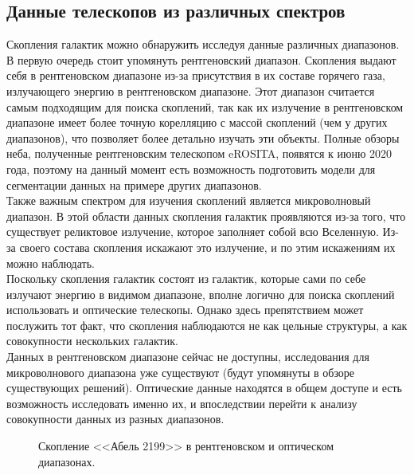 \subsection{Данные телескопов из различных спектров}

Скопления галактик можно обнаружить исследуя данные различных диапазонов.\\

В первую очередь стоит упомянуть рентгеновский диапазон. Скопления выдают себя в рентгеновском 
диапазоне из-за присутствия в их составе горячего газа, излучающего энергию в рентгеновском 
диапазоне. Этот диапазон считается самым подходящим для поиска скоплений, так как их излучение 
в рентгеновском диапазоне имеет более точную корелляцию с массой скоплений (чем у других диапазонов), 
что позволяет более детально изучать эти объекты. Полные обзоры неба, полученные рентгеновским 
телескопом eROSITA, появятся к июню 2020 года, поэтому на данный момент есть возможность 
подготовить модели для сегментации данных на примере других диапазонов.\\

Также важным спектром для изучения скоплений является микроволновый диапазон. В этой области данных 
скопления галактик проявляются из-за того, что существует реликтовое излучение, которое заполняет 
собой всю Вселенную. Из-за своего состава скопления искажают это излучение, и по этим искажениям 
их можно наблюдать.\\ 

Поскольку скопления галактик состоят из галактик, которые сами по себе излучают энергию в видимом 
диапазоне, вполне логично для поиска скоплений использовать и оптические телескопы. Однако здесь 
препятствием может послужить тот факт, что скопления наблюдаются не как цельные структуры, а как 
совокупности нескольких галактик. \\

Данных в рентгеновском диапазоне сейчас не доступны, исследования для микроволнового диапазона уже 
существуют (будут упомянуты в обзоре существующих решений). Оптические данные находятся в общем 
доступе и есть возможность исследовать именно их, и впоследствии перейти к анализу совокупности 
данных из разных диапазонов.\\

\begin{figure}[h]
    \caption{Скопление <<Абель 2199>> в рентгеновском и оптическом диапазонах. \cite{Abell}}
\end{figure}


